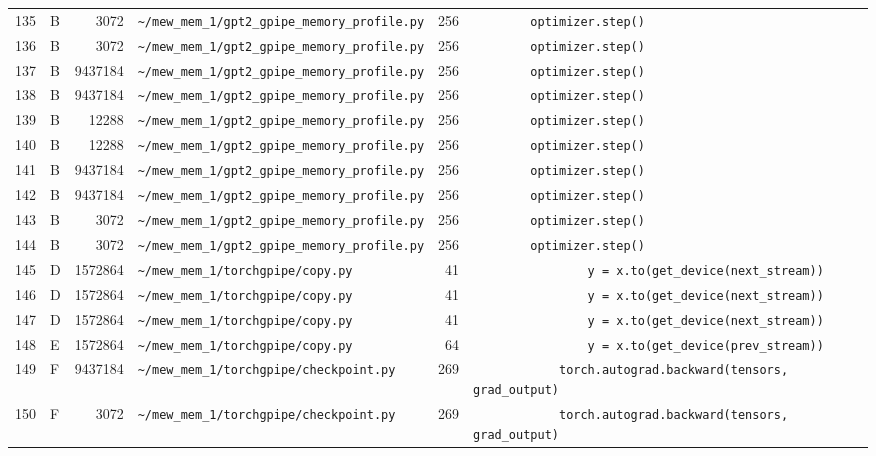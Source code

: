 \documentclass{article}
\begin{document}
\begin{longtable}{r l r p{6.5cm} r p{7.0cm}}
135 & B & 3072 & \lstinline|~/mew_mem_1/gpt2_gpipe_memory_profile.py| & 256 & \lstinline|        optimizer.step()| \\
136 & B & 3072 & \lstinline|~/mew_mem_1/gpt2_gpipe_memory_profile.py| & 256 & \lstinline|        optimizer.step()| \\
137 & B & 9437184 & \lstinline|~/mew_mem_1/gpt2_gpipe_memory_profile.py| & 256 & \lstinline|        optimizer.step()| \\
138 & B & 9437184 & \lstinline|~/mew_mem_1/gpt2_gpipe_memory_profile.py| & 256 & \lstinline|        optimizer.step()| \\
139 & B & 12288 & \lstinline|~/mew_mem_1/gpt2_gpipe_memory_profile.py| & 256 & \lstinline|        optimizer.step()| \\
140 & B & 12288 & \lstinline|~/mew_mem_1/gpt2_gpipe_memory_profile.py| & 256 & \lstinline|        optimizer.step()| \\
141 & B & 9437184 & \lstinline|~/mew_mem_1/gpt2_gpipe_memory_profile.py| & 256 & \lstinline|        optimizer.step()| \\
142 & B & 9437184 & \lstinline|~/mew_mem_1/gpt2_gpipe_memory_profile.py| & 256 & \lstinline|        optimizer.step()| \\
143 & B & 3072 & \lstinline|~/mew_mem_1/gpt2_gpipe_memory_profile.py| & 256 & \lstinline|        optimizer.step()| \\
144 & B & 3072 & \lstinline|~/mew_mem_1/gpt2_gpipe_memory_profile.py| & 256 & \lstinline|        optimizer.step()| \\
145 & D & 1572864 & \lstinline|~/mew_mem_1/torchgpipe/copy.py| & 41 & \lstinline|                y = x.to(get_device(next_stream))| \\
146 & D & 1572864 & \lstinline|~/mew_mem_1/torchgpipe/copy.py| & 41 & \lstinline|                y = x.to(get_device(next_stream))| \\
147 & D & 1572864 & \lstinline|~/mew_mem_1/torchgpipe/copy.py| & 41 & \lstinline|                y = x.to(get_device(next_stream))| \\
148 & E & 1572864 & \lstinline|~/mew_mem_1/torchgpipe/copy.py| & 64 & \lstinline|                y = x.to(get_device(prev_stream))| \\
149 & F & 9437184 & \lstinline|~/mew_mem_1/torchgpipe/checkpoint.py| & 269 & \lstinline|            torch.autograd.backward(tensors, grad_output)| \\
150 & F & 3072 & \lstinline|~/mew_mem_1/torchgpipe/checkpoint.py| & 269 & \lstinline|            torch.autograd.backward(tensors, grad_output)| \\

\end{longtable}
\end{document}
